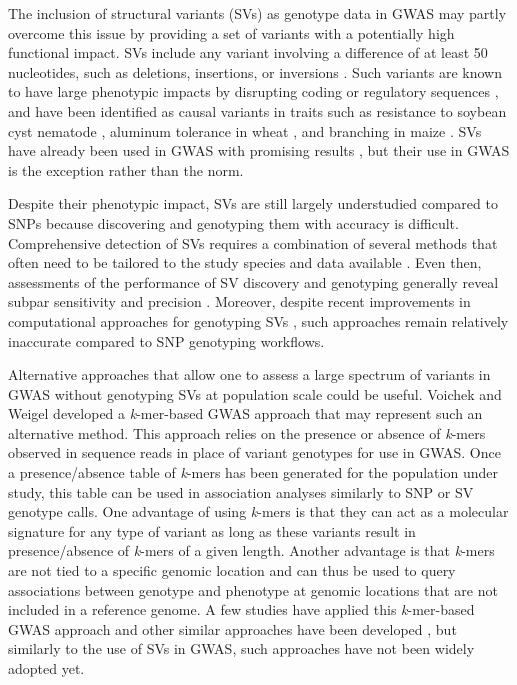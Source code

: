 \documentclass[doublespacing]{bmcart}
\begin{document}
The inclusion of structural variants (SVs) as genotype data in GWAS may partly overcome
this issue by providing a set of variants with a potentially high functional impact.
SVs include any variant involving a difference of at least 50 nucleotides, such as
deletions, insertions, or inversions \cite{ho2020}. Such variants are known to
have large phenotypic impacts by disrupting coding or regulatory sequences
\cite{marroni2014}, and have been identified as causal variants in traits such
as resistance to soybean cyst nematode \cite{cook2012}, aluminum tolerance in
wheat \cite{maron2013}, and branching in maize \cite{studer2011}.  SVs have
already been used in GWAS with promising results
\cite[e.g.][]{zhang2015, akakpo2020, dominguez2020, liu2020-pangenome}, but
their use in GWAS is the exception rather than the norm.

Despite their phenotypic impact, SVs are still largely understudied compared to
SNPs because discovering and genotyping them with accuracy is difficult.
Comprehensive detection of SVs requires a combination of several methods that
often need to be tailored to the study species and data available
\cite{alkan2011, ho2020}. Even then, assessments of the performance of SV
discovery and genotyping generally reveal subpar sensitivity and precision
\cite[e.g.][]{cameron2019, chaisson2019, kosugi2019}. Moreover, despite recent
improvements in computational approaches for genotyping SVs
\cite[e.g.][]{siren2021, ebler2022}, such approaches remain relatively
inaccurate compared to SNP genotyping workflows.

Alternative approaches that allow one to assess a large spectrum
of variants in GWAS without genotyping SVs at population scale could be useful.
Voichek and Weigel \cite{voichek2020} developed a \emph{k}-mer-based GWAS approach that may
represent such an alternative method. This approach relies on the presence or
absence of \emph{k}-mers observed in sequence reads in place of variant genotypes for use in
GWAS. Once a presence/absence table of \emph{k}-mers has been generated for the
population under study, this table can be used in association analyses
similarly to SNP or SV genotype calls. One advantage of using \emph{k}-mers is
that they can act as a molecular signature for any type of variant as long as
these variants result in presence/absence of \emph{k}-mers of a given length.
Another advantage is that \emph{k}-mers are not tied to a specific genomic
location and can thus be used to query associations between genotype and
phenotype at genomic locations that are not included in a reference genome.  A
few studies have applied this \emph{k}-mer-based GWAS approach
\cite[e.g.][]{tripodi2021, colque2021} and other similar approaches have been
developed \cite{rahman2018, he2021}, but similarly to the use of SVs in GWAS,
such approaches have not been widely adopted yet.
\end{document}

